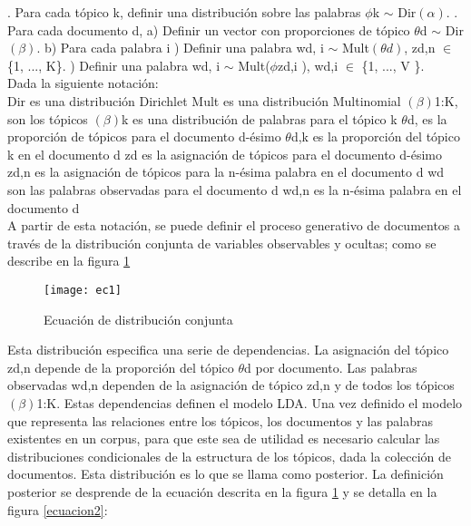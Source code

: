 . Para cada tópico k, definir una distribución sobre las palabras  $\phi$k $\sim$ Dir$( \alpha )$.
. Para cada documento d,
\subsubitem a) Definir un vector con proporciones de tópico $\theta$d $\sim$ Dir$(\beta)$.
\subsubitem b) Para cada palabra i
\subsubitem {}) Definir una palabra wd, i $\sim$ Mult$(\theta d)$, zd,n $\in$ \{1, ..., K\}.
\subsubitem {}) Definir una palabra wd, i $\sim$ Mult($\phi$zd,i ), wd,i  $\in$ \{1, ..., V \}.\\
\subitem Dada la siguiente notación:\\
\subitem Dir es una distribución Dirichlet
\subitem Mult es una distribución Multinomial
\subitem $(\beta)$1:K, son los tópicos
\subitem $(\beta)$k es una distribución de palabras para el tópico k
\subitem $\theta$d, es la proporción de tópicos para el documento d-ésimo
\subitem $\theta$d,k es la proporción del tópico k en el documento d
\subitem zd es la asignación de tópicos para el documento d-ésimo
\subitem zd,n es la asignación de tópicos para la n-ésima palabra en el documento d
\subitem wd son las palabras observadas para el documento d
\subitem wd,n es la n-ésima palabra en el documento d \\


A partir de esta notación, se puede definir el proceso generativo de documentos a
través de la distribución conjunta de variables observables y ocultas; como se describe en la figura \ref{ecuacion1} \\

\begin{figure}[H]
\texttt{[image: ec1]}
\caption{Ecuación de distribución conjunta \cite{DescubrimientoPatrones}}
\label{ecuacion1}
\end{figure}


Esta distribución especifica una serie de dependencias. La asignación del tópico zd,n
depende de la proporción del tópico $\theta$d por documento.
Las palabras observadas wd,n dependen de la asignación de tópico zd,n y de todos
los tópicos $(\beta)$1:K. Estas dependencias definen el modelo LDA.
Una vez definido el modelo que representa las relaciones entre los tópicos, los documentos
y las palabras existentes en un corpus, para que este sea de utilidad es necesario
calcular las distribuciones condicionales de la estructura de los tópicos, dada la colección
de documentos. Esta distribución es lo que se llama como posterior. La definición
posterior se desprende de la ecuación descrita en la figura \ref{ecuacion1} y se detalla en la figura \ref{ecuacion2}:\\

